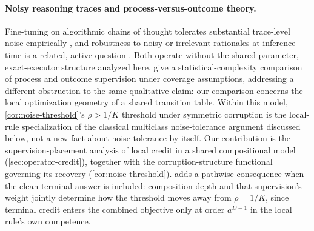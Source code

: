 \paragraph{Noisy reasoning traces and process-versus-outcome theory.}
Fine-tuning on algorithmic chains of thought tolerates substantial
trace-level noise empirically \citep{havrilla2024noise}, and robustness
to noisy or irrelevant rationales at inference time is a related, active
question \citep{zhou2024noisyrationales}. Both operate without the
shared-parameter, exact-executor structure analyzed here.
\citet{jia2025verify} give a statistical-complexity comparison of process
and outcome supervision under coverage assumptions, addressing a
different obstruction to the same qualitative claim: our comparison
concerns the local optimization geometry of a shared transition table.
Within this model, \cref{cor:noise-threshold}'s $\rho>1/K$ threshold
under symmetric corruption is the local-rule specialization of the
classical multiclass noise-tolerance argument discussed below, not a new
fact about noise tolerance by itself. Our contribution is the
supervision-placement analysis of local credit in a shared compositional
model (\cref{sec:operator-credit}), together with the corruption-structure
functional governing its recovery (\cref{cor:noise-threshold}).
 adds a pathwise consequence when the clean
terminal answer is included: composition depth and that supervision's
weight jointly determine how the threshold moves away from $\rho=1/K$,
since terminal credit enters the combined objective only at order
$a^{D-1}$ in the local rule's own competence.


